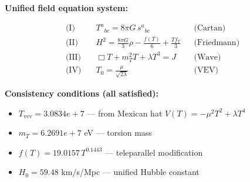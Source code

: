 
\textbf{Unified field equation system:}

\begin{align}
  \text{(I)} \quad & T^a{}_{bc} = 8\pi G \, s^a{}_{bc} && \text{(Cartan)} \\
  \text{(II)} \quad & H^2 = \frac{8\pi G}{3}\rho - \frac{f(T)}{6} + \frac{Tf_T}{3} && \text{(Friedmann)} \\
  \text{(III)} \quad & \Box T + m_T^2 T + \lambda T^3 = J && \text{(Wave)} \\
  \text{(IV)} \quad & T_0 = \frac{\mu}{\sqrt{2\lambda}} && \text{(VEV)}
\end{align}

\textbf{Consistency conditions (all satisfied):}
\begin{itemize}
  \item $T_{\text{vev}} = 3.0834e+7$ — from Mexican hat $V(T) = -\mu^2 T^2 + \lambda T^4$
  \item $m_T = 6.2691e+7$ eV — torsion mass
  \item $f(T) = 19.0157 \, T^{0.1443}$ — teleparallel modification
  \item $H_0 = 59.48$ km/s/Mpc — unified Hubble constant
\end{itemize}